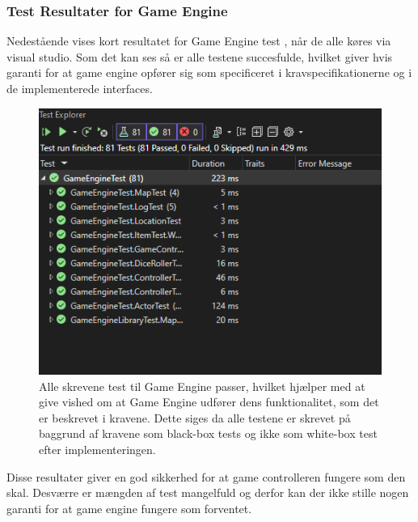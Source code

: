 \subsubsection{Test Resultater for Game Engine}
Nedestående vises kort resultatet for Game Engine test \parencite[Section 12.2.1][]{TekniskBilag}, når de alle køres via visual
studio. Som det kan ses så er alle testene succesfulde, hvilket giver hvis garanti for at
game engine opfører sig som specificeret i kravspecifikationerne og i de implementerede interfaces.

\begin{figure}[H]
  \centering
  \includegraphics[scale=0.4]{02-body/Images/Test Results.png}
    \caption{Alle skrevene test til Game Engine passer, hvilket hjælper med at give vished
          om at Game Engine udfører dens funktionalitet, som det er beskrevet i kravene.
          Dette siges da alle testene er skrevet på baggrund af kravene som black-box tests
          og ikke som white-box test efter implementeringen.}
  \label{fig:TestResultsGameEngine}
\end{figure}

\noindent Disse resultater giver en god sikkerhed for at game controlleren fungere som den skal. Desværre er 
mængden af test mangelfuld og derfor kan der ikke stille nogen garanti for at game engine fungere
som forventet.

\newpage
